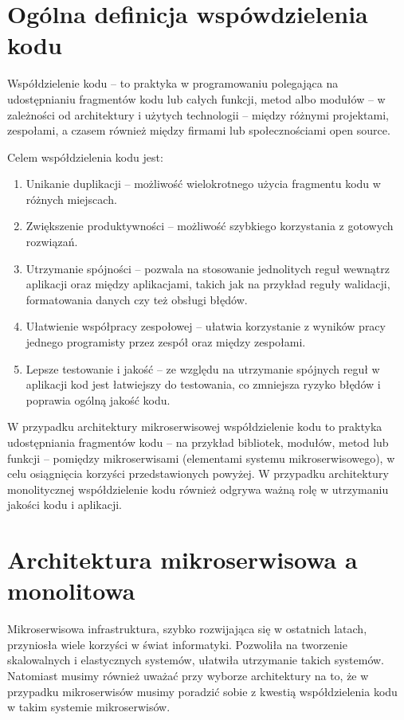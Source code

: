 \documentclass[runningheads,12pt]{llncs}
\begin{document}
\newpage

\section{Ogólna definicja wspówdzielenia kodu}

Współdzielenie kodu – to praktyka w programowaniu polegająca na udostępnianiu fragmentów kodu lub całych funkcji, metod albo modułów – w zależności od architektury i użytych technologii – między różnymi projektami, zespołami, a czasem również między firmami lub społecznościami open source.

Celem współdzielenia kodu jest:

\begin{enumerate}
    \item Unikanie duplikacji – możliwość wielokrotnego użycia fragmentu kodu w różnych miejscach.
    \item Zwiększenie produktywności – możliwość szybkiego korzystania z gotowych rozwiązań.
    \item Utrzymanie spójności – pozwala na stosowanie jednolitych reguł wewnątrz aplikacji oraz między aplikacjami, takich jak na przykład reguły walidacji, formatowania danych czy też obsługi błędów.
    \item Ułatwienie współpracy zespołowej – ułatwia korzystanie z wyników pracy jednego programisty przez zespół oraz między zespołami.
    \item Lepsze testowanie i jakość – ze względu na utrzymanie spójnych reguł w aplikacji kod jest łatwiejszy do testowania, co zmniejsza ryzyko błędów i poprawia ogólną jakość kodu.
\end{enumerate}
    
W przypadku architektury mikroserwisowej współdzielenie kodu to praktyka udostępniania fragmentów kodu – na przykład bibliotek, modułów, metod lub funkcji – pomiędzy mikroserwisami (elementami systemu mikroserwisowego), w celu osiągnięcia korzyści przedstawionych powyżej. W przypadku architektury monolitycznej współdzielenie kodu również odgrywa ważną rolę w utrzymaniu jakości kodu i aplikacji.

\section{Architektura mikroserwisowa a monolitowa}

Mikroserwisowa infrastruktura, szybko rozwijająca się w ostatnich latach, przyniosła wiele korzyści w świat informatyki. Pozwoliła na tworzenie skalowalnych i elastycznych systemów, ułatwiła utrzymanie takich systemów. Natomiast musimy również uważać przy wyborze architektury na to, że w przypadku mikroserwisów musimy poradzić sobie z kwestią współdzielenia kodu w takim systemie mikroserwisów.
\end{document}
